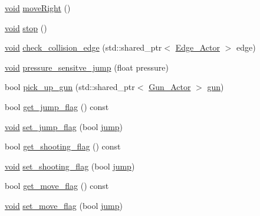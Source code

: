 \begin{DoxyCompactItemize}
\item 
\hyperlink{imgui__impl__opengl3__loader_8h_ac668e7cffd9e2e9cfee428b9b2f34fa7}{void} \hyperlink{classAnimated__Player__Actor_a8ddbff2c1e30f700832d987b362669b5}{move\+Right} ()
\item 
\hyperlink{imgui__impl__opengl3__loader_8h_ac668e7cffd9e2e9cfee428b9b2f34fa7}{void} \hyperlink{classAnimated__Player__Actor_a67f7bb9c2544d32c2d35a29c4e245f10}{stop} ()
\item 
\hyperlink{imgui__impl__opengl3__loader_8h_ac668e7cffd9e2e9cfee428b9b2f34fa7}{void} \hyperlink{classAnimated__Player__Actor_acd9a4dee055dd82f0588db375dde0ca7}{check\+\_\+collision\+\_\+edge} (std\+::shared\+\_\+ptr$<$ \hyperlink{classEdge__Actor}{Edge\+\_\+\+Actor} $>$ edge)
\item 
\hyperlink{imgui__impl__opengl3__loader_8h_ac668e7cffd9e2e9cfee428b9b2f34fa7}{void} \hyperlink{classAnimated__Player__Actor_a231e2dd478cf7583529ce058e6da082f}{pressure\+\_\+sensitve\+\_\+jump} (float pressure)
\item 
bool \hyperlink{classAnimated__Player__Actor_a1dc051ee2ceb0b0f4d3be1f02dac5ff0}{pick\+\_\+up\+\_\+gun} (std\+::shared\+\_\+ptr$<$ \hyperlink{classGun__Actor}{Gun\+\_\+\+Actor} $>$ \hyperlink{game__play__state_8cpp_add80b8ad6081fe06bcfb1956a830b5fd}{gun})
\item 
bool \hyperlink{classAnimated__Player__Actor_aac846074a509a83f033258ca84a8d41f}{get\+\_\+jump\+\_\+flag} () const
\item 
\hyperlink{imgui__impl__opengl3__loader_8h_ac668e7cffd9e2e9cfee428b9b2f34fa7}{void} \hyperlink{classAnimated__Player__Actor_a7e0fb150e4e6a0a588b126a7251b059d}{set\+\_\+jump\+\_\+flag} (bool \hyperlink{classAnimated__Player__Actor_a05ff973dde6e3409c66b933407748997}{jump})
\item 
bool \hyperlink{classAnimated__Player__Actor_a68f4ad7c2fb88bf5c608d79157f506b9}{get\+\_\+shooting\+\_\+flag} () const
\item 
\hyperlink{imgui__impl__opengl3__loader_8h_ac668e7cffd9e2e9cfee428b9b2f34fa7}{void} \hyperlink{classAnimated__Player__Actor_a48472acfb2041970e148be3a99d6fcaa}{set\+\_\+shooting\+\_\+flag} (bool \hyperlink{classAnimated__Player__Actor_a05ff973dde6e3409c66b933407748997}{jump})
\item 
bool \hyperlink{classAnimated__Player__Actor_a97607376e26b559e468567ab4ac98569}{get\+\_\+move\+\_\+flag} () const
\item 
\hyperlink{imgui__impl__opengl3__loader_8h_ac668e7cffd9e2e9cfee428b9b2f34fa7}{void} \hyperlink{classAnimated__Player__Actor_a16d5a1c9a0a71b5ce19f7d7efff643be}{set\+\_\+move\+\_\+flag} (bool \hyperlink{classAnimated__Player__Actor_a05ff973dde6e3409c66b933407748997}{jump})

\end{DoxyCompactItemize}
